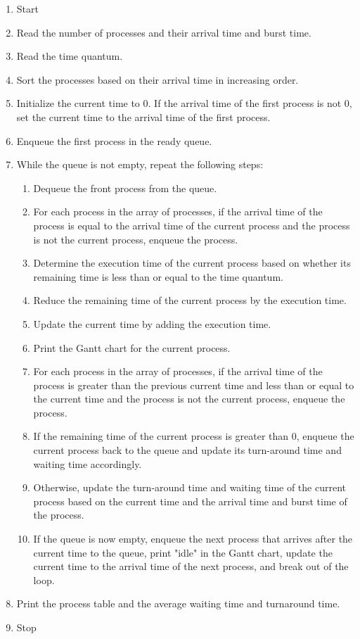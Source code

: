 \begin{enumerate}
   \item Start
   \item Read the number of processes and their arrival time and burst time.
   \item Read the time quantum.
   \item Sort the processes based on their arrival time in increasing order.
   \item Initialize the current time to 0. If the arrival time of the first process is not 0, set the current time to the arrival time of the first process.
   \item Enqueue the first process in the ready queue.
   \item While the queue is not empty, repeat the following steps:
   \begin{enumerate}
       \item Dequeue the front process from the queue.
       \item For each process in the array of processes, if the arrival time of the process is equal to the arrival time of the current process and the process is not the current process, enqueue the process.
       \item Determine the execution time of the current process based on whether its remaining time is less than or equal to the time quantum.
       \item Reduce the remaining time of the current process by the execution time.
       \item Update the current time by adding the execution time.
       \item Print the Gantt chart for the current process.
       \item For each process in the array of processes, if the arrival time of the process is greater than the previous current time and less than or equal to the current time and the process is not the current process, enqueue the process.
       \item If the remaining time of the current process is greater than 0, enqueue the current process back to the queue and update its turn-around time and waiting time accordingly.
       \item Otherwise, update the turn-around time and waiting time of the current process based on the current time and the arrival time and burst time of the process.
       \item If the queue is now empty, enqueue the next process that arrives after the current time to the queue, print "idle" in the Gantt chart, update the current time to the arrival time of the next process, and break out of the loop.
   \end{enumerate}
   \item Print the process table and the average waiting time and turnaround time.
   \item Stop
\end{enumerate}

